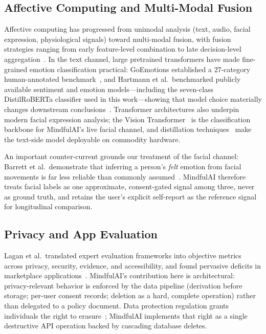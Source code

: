 \documentclass[11pt,a4paper]{article}
\newcommand{\system}{MindfulAI}
\begin{document}
\subsection{Affective Computing and Multi-Modal Fusion}\label{sec:affective}

Affective computing has progressed from unimodal analysis (text, audio, facial expression, physiological signals) toward multi-modal fusion, with fusion strategies ranging from early feature-level combination to late decision-level aggregation~\cite{poria2017}. In the text channel, large pretrained transformers have made fine-grained emotion classification practical: GoEmotions established a 27-category human-annotated benchmark~\cite{demszky2020}, and Hartmann et al.\ benchmarked publicly available sentiment and emotion models---including the seven-class DistilRoBERTa classifier used in this work---showing that model choice materially changes downstream conclusions~\cite{hartmann2023}. Transformer architectures also underpin modern facial expression analysis; the Vision Transformer~\cite{dosovitskiy2021} is the classification backbone for \system{}'s live facial channel, and distillation techniques~\cite{sanh2019,liu2019} make the text-side model deployable on commodity hardware.

An important counter-current grounds our treatment of the facial channel: Barrett et al.\ demonstrate that inferring a person's \emph{felt} emotion from facial movements is far less reliable than commonly assumed~\cite{barrett2019}. \system{} therefore treats facial labels as one approximate, consent-gated signal among three, never as ground truth, and retains the user's explicit self-report as the reference signal for longitudinal comparison.

\subsection{Privacy and App Evaluation}\label{sec:privacy}

Lagan et al.\ translated expert evaluation frameworks into objective metrics across privacy, security, evidence, and accessibility, and found pervasive deficits in marketplace applications~\cite{lagan2020}. \system{}'s contribution here is architectural: privacy-relevant behavior is enforced by the data pipeline (derivation before storage; per-user consent records; deletion as a hard, complete operation) rather than delegated to a policy document. Data protection regulation grants individuals the right to erasure~\cite{gdpr2016}; \system{} implements that right as a single destructive API operation backed by cascading database deletes.
\end{document}
